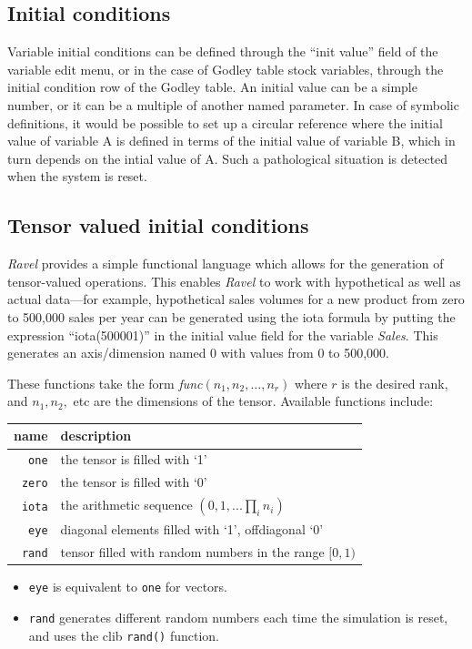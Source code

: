 \subsection{Initial conditions}

\label{var:init}

Variable initial conditions can be defined through the ``init value''
field of the variable edit menu, or in the case of Godley table stock
variables, through the initial condition row of the Godley table.
An initial value can be a simple number, or it can be a multiple of
another named parameter. In case of symbolic definitions, it would
be possible to set up a circular reference where the initial value
of variable A is defined in terms of the initial value of variable
B, which in turn depends on the intial value of A. Such a pathological
situation is detected when the system is reset.

\subsection{Tensor valued initial conditions}

\label{tensor-init}

\emph{Ravel} provides a simple functional language which allows for
the generation of tensor-valued operations. This enables \emph{Ravel}
to work with hypothetical as well as actual data---for example, hypothetical
sales volumes for a new product from zero to 500,000 sales per year
can be generated using the iota formula by putting the expression
``iota(500001)'' in the initial value field for the variable \emph{Sales}.
This generates an axis/dimension named 0 with values from 0 to 500,000. 

These functions take the form {\em func}$(n_{1},n_{2},\ldots,n_{r})$
where $r$ is the desired rank, and $n_{1},n_{2},$ etc are the dimensions
of the tensor. Available functions include:

\begin{tabular}{|r|l|}
\hline 
name  & description\tabularnewline
\hline 
\verb+one+ & the tensor is filled with `1'\tabularnewline
\verb+zero+ & the tensor is filled with `0'\tabularnewline
\verb+iota+ & the arithmetic sequence $(0,1,...\prod_{i}n_{i})$\tabularnewline
\verb+eye+ & diagonal elements filled with `1', offdiagonal `0'\tabularnewline
\verb+rand+ & tensor filled with random numbers in the range $[0,1)$\tabularnewline
\hline 
\end{tabular}
\begin{itemize}
\item \verb+eye+ is equivalent to \verb+one+ for vectors. 
\item \verb+rand+ generates different random numbers each time the simulation
is reset, and uses the clib \verb+rand()+ function. 
\end{itemize}

